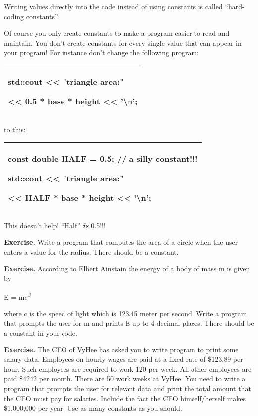\documentclass[
]{article}
\begin{document}
Writing values directly into the code instead of using constants is
called ``hard-coding constants''.

Of course you only create constants to make a program easier to read and
maintain. You don't create constants for every single value that can
appear in your program! For instance don't change the following program:

\begin{longtable}[]{@{}l@{}}
\toprule
\endhead
\begin{minipage}[t]{0.97\columnwidth}\raggedright
std::cout \textless\textless{} "triangle area:"

\textless\textless{} 0.5 * base * height \textless\textless{}
'\textbackslash n';\strut
\end{minipage}\tabularnewline
\bottomrule
\end{longtable}

to this:

\begin{longtable}[]{@{}l@{}}
\toprule
\endhead
\begin{minipage}[t]{0.97\columnwidth}\raggedright
const double HALF = 0.5; // a silly constant!!!

std::cout \textless\textless{} "triangle area:"

\textless\textless{} HALF * base * height \textless\textless{}
'\textbackslash n';\strut
\end{minipage}\tabularnewline
\bottomrule
\end{longtable}

This doesn't help! ``Half'' \emph{\textbf{is}} 0.5!!!

\textbf{Exercise.} Write a program that computes the area of a circle
when the user enters a value for the radius. There should be a constant.

\textbf{Exercise.} According to Elbert Ainstain the energy of a body of
mass m is given by

E = mc\textsuperscript{\emph{3}}

where c is the speed of light which is 123.45 meter per second. Write a
program that prompts the user for m and prints E up to 4 decimal places.
There should be a constant in your code.

\textbf{Exercise.} The CEO of VyHee has asked you to write program to
print some salary data. Employees on hourly wages are paid at a fixed
rate of \$123.89 per hour. Such employees are required to work 120 per
week. All other employees are paid \$4242 per month. There are 50 work
weeks at VyHee. You need to write a program that prompts the user for
relevant data and print the total amount that the CEO must pay for
salaries. Include the fact the CEO himself/herself makes \$1,000,000 per
year. Use as many constants as you should.
\end{document}
